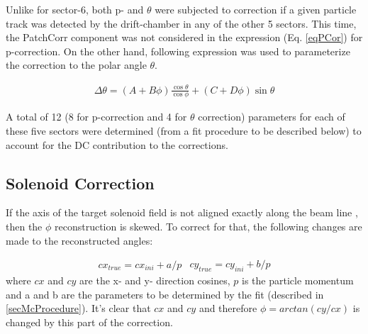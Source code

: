 Unlike for sector-6, both p- and $\theta$ were subjected to correction if a given particle track was detected by the drift-chamber in any of the other 5 sectors. This time, the PatchCorr component was not considered in the expression (Eq. \ref{eqPCor}) for p-correction. On the other hand, following expression was used to parameterize the correction to the polar angle $\theta$.

\begin{eqnarray}
\label{eqThCor}
\Delta\theta = (A+B\phi)\frac{\cos\theta}{\cos\phi} + (C+D\phi)\sin\theta
\end{eqnarray}

A total of 12 (8 for p-correction and 4 for $\theta$ correction) parameters for each of these five sectors were determined (from a fit procedure to be described below) to account for the DC contribution to the corrections. 









\subsection{Solenoid Correction} 

If the axis of the target solenoid field is not aligned exactly along the beam line%
, then the $\phi$ reconstruction is skewed. To correct for that, the following changes %
are made to the reconstructed angles: 

\begin{subequations}
\label{eqTiltCor}
\begin{eqnarray}
\label{eqTiltCor1}
cx_{true} = cx_{ini} + a/p %
\end{eqnarray}

\begin{eqnarray}
\label{eqTiltCor2}
cy_{true} = cy_{ini} + b/p
\end{eqnarray}
\end{subequations}
where $cx$ and $cy$ are the x- and y- direction cosines, $p$ is the particle momentum and a and b are the parameters to be determined by the fit (described in \ref{secMcProcedure}). %
It's clear that $cx$ and $cy$ and therefore $\phi = arctan(cy/cx)$ %
is changed by this part of the correction.





